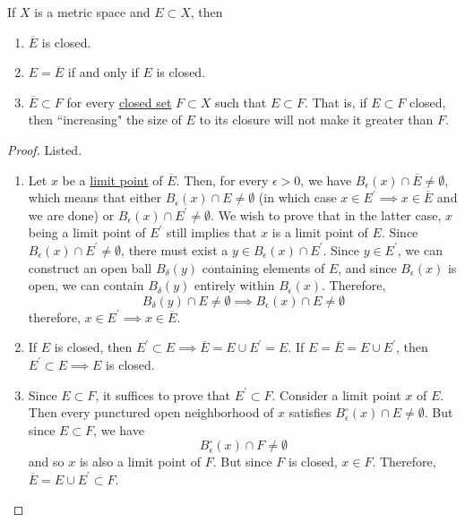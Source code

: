   \begin{theorem}
    \label{thm:characterizations-of-the-closure-in-a-metric}
    If $X$ is a metric space and $E \subset X$, then 
    \begin{enumerate}
      \item $\overline{E}$ is closed. 
      \item $E = \overline{E}$ if and only if $E$ is closed. 
      \item $\overline{E} \subset F$ for every \hyperref[def:closed]{closed set} $F \subset X$ such that $E \subset F$. That is, if $E \subset F$ closed, then ``increasing" the size of $E$ to its closure will not make it greater than $F$. 
    \end{enumerate}
  \end{theorem}
  \begin{proof}
    Listed. 
    \begin{enumerate}
      \item Let $x$ be a \hyperref[def:limit-point]{limit point} of $\overline{E}$. Then, for every $\epsilon > 0$, we have $B_\epsilon (x) \cap \overline{E} \neq \emptyset$, which means that either $B_\epsilon (x) \cap E \neq \emptyset$ (in which case $x \in E^\prime \implies x \in \overline{E}$ and we are done) or $B_\epsilon (x) \cap E^\prime \neq \emptyset$. We wish to prove that in the latter case, $x$ being a limit point of $E^\prime$ still implies that $x$ is a limit point of $E$. Since $B_\epsilon (x) \cap E^\prime \neq \emptyset$, there must exist a $y \in B_\epsilon (x) \cap E^\prime$. Since $y \in E^\prime$, we can construct an open ball $B_\delta (y)$ containing elements of $E$, and since $B_\epsilon (x)$ is open, we can contain $B_\delta (y)$ entirely within $B_\epsilon (x)$. Therefore, 
      \begin{equation}
        B_\delta (y) \cap E \neq \emptyset \implies B_\epsilon (x) \cap E \neq \emptyset
      \end{equation}
      therefore, $x \in E^\prime \implies x \in \overline{E}$. 

      \item If $E$ is closed, then $E^\prime \subset E \implies \overline{E} = E \cup E^\prime = E$. If $E = \overline{E} = E \cup E^\prime$, then $E^\prime \subset E \implies E$ is closed. 

      \item Since $E \subset F$, it suffices to prove that $E^\prime \subset F$. Consider a limit point $x$ of $E$. Then every punctured open neighborhood of $x$ satisfies $B_\epsilon^\circ (x) \cap E \neq \emptyset$. But since $E \subset F$, we have 
      \begin{equation}
        B_\epsilon^\circ (x) \cap F \neq \emptyset
      \end{equation}
      and so $x$ is also a limit point of $F$. But since $F$ is closed, $x \in F$. Therefore, $\overline{E} = E \cup E^\prime \subset F$. 
    \end{enumerate}
  \end{proof}

